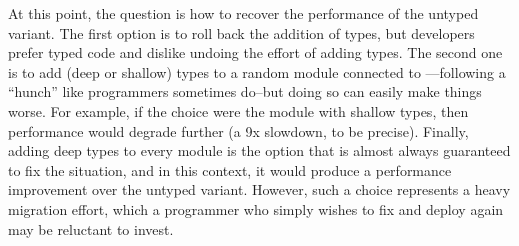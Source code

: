 
At this point, the question is how to recover the performance of the untyped
variant. The first option is to roll back the addition of types, but developers
prefer typed code and dislike undoing the effort of adding types. The second one
is to add (deep or shallow) types to a random module connected to ---following a
``hunch'' like programmers sometimes do--but doing so can easily make things
worse. For example, if the choice were the  module with shallow
types, then performance would degrade further (a 9x slowdown, to be
precise). Finally, adding deep types to every module is the option that is almost
always guaranteed to fix the situation, and in this context, it would produce a
performance improvement over the untyped variant.  However, such a choice
represents a heavy migration effort, which a programmer who simply
wishes to fix  and deploy again may be reluctant to invest.


